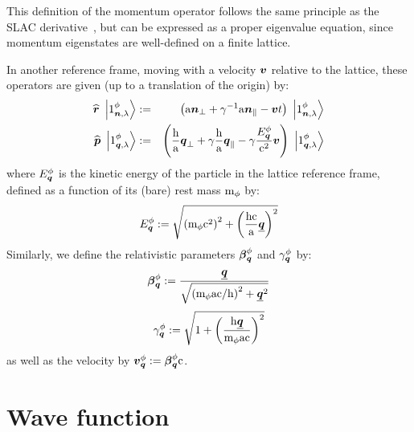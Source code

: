 \documentclass[10pt,a4paper,twoside,openany]{book}
\begin{document}
 This definition of the momentum operator follows the same principle as the SLAC derivative~\cite{Rabin1981}, but can be expressed as a proper eigenvalue equation, since momentum eigenstates are well-defined on a finite lattice.

 In another reference frame, moving with a velocity $\boldsymbol{v}$ relative to the lattice, these operators are given (up to a translation of the origin) by:
\begin{eqnarray*}
\widehat{\boldsymbol{r}} \ \left|{{1}^{\phi}_{{\boldsymbol{n}}, {\lambda}}}\right\rangle & := & \left( \mathrm a \boldsymbol{n}_\perp + \gamma^{-1} \mathrm a  \boldsymbol{n}_\parallel - \boldsymbol{v} t \right) \ \left|{{1}^{\phi}_{{\boldsymbol{n}}, {\lambda}}}\right\rangle \\
\widehat{\boldsymbol{p}} \ \left|{{1}^{\phi}_{{\boldsymbol{q}}, {\lambda}}}\right\rangle & := & \left( \frac {\mathrm h} {\mathrm a} \boldsymbol{q}_\perp + \gamma \frac {\mathrm h} {\mathrm a} \boldsymbol{q}_\parallel - \gamma \frac {E^{\phi}_{\boldsymbol{q}}} {\mathrm c^2} \boldsymbol{v} \right) \ \left|{{1}^{\phi}_{{\boldsymbol{q}}, {\lambda}}}\right\rangle
\end{eqnarray*}
where $E^{\phi}_{\boldsymbol{q}}$ is the kinetic energy of the particle in the lattice reference frame, defined as a function of its (bare) rest mass $\mathrm m_{\phi}$ by:
\begin{equation*}
E^{\phi}_{\boldsymbol{q}} := \sqrt{\left( \mathrm m_{\phi} \mathrm c^2 \right)^2 + \left( \frac{\mathrm h \mathrm c}{\mathrm a} \underline{\boldsymbol{q}} \right)^2}
\end{equation*}
Similarly, we define the relativistic parameters $\boldsymbol{\beta}^{\phi}_{\boldsymbol{q}}$ and $\gamma^{\phi}_{\boldsymbol{q}}$ by:
\begin{equation*}
\boldsymbol{\beta}^{\phi}_{\boldsymbol{q}} := \frac{\underline{\boldsymbol{q}}}{\sqrt{\left( \mathrm m_{\phi} \mathrm a \mathrm c / \mathrm h \right)^2 + \underline{\boldsymbol{q}}^2}}
\end{equation*}
\begin{equation*}
\gamma^{\phi}_{\boldsymbol{q}} := \sqrt{1 + \left( \frac{\mathrm h \underline{\boldsymbol{q}}}{\mathrm m_{\phi} \mathrm a \mathrm c} \right)^2}
\end{equation*}
as well as the velocity by $\boldsymbol{v}^{\phi}_{\boldsymbol{q}} := \boldsymbol{\beta}^{\phi}_{\boldsymbol{q}} \mathrm c$.

\section{Wave function}
\end{document}
